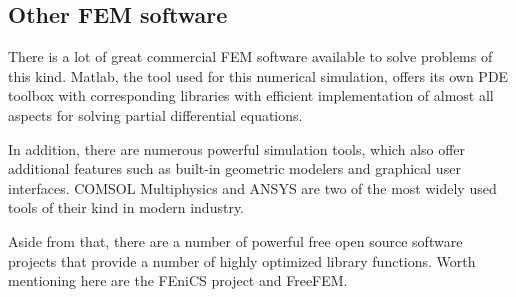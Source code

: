 \documentclass[parskip=half, titlepage=yes, 12pt, BCOR=12mm, DIV=calc]{scrartcl}
\begin{document}


\subsection{Other FEM software}

There is a lot of great commercial FEM software available to solve problems of this kind. Matlab, the tool used for this numerical simulation, offers its own PDE toolbox with corresponding libraries with efficient implementation of almost all aspects for solving partial differential equations.

In addition, there are numerous powerful simulation tools, which also offer additional features such as built-in geometric modelers and graphical user interfaces. COMSOL Multiphysics and ANSYS are two of the most widely used tools of their kind in modern industry.

Aside from that, there are a number of powerful free open source software projects that provide a number of highly optimized library functions. Worth mentioning here are the FEniCS project and FreeFEM.


\newpage


\clearpage
\nocite{*}
\printbibliography

\newpage


%  
\end{document}
